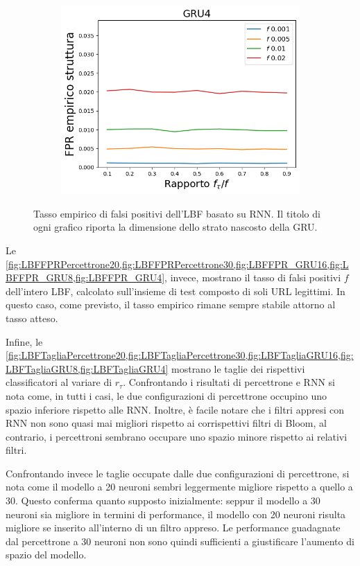 \documentclass[../../main.tex]{subfiles}
\begin{document}
\begin{figure}[H]
        \begin{subfigure}[b]{0.49\textwidth}
            \centering
            \includegraphics[width = \textwidth]{immagini/7/LBF/GRU4_FPR.png}
            \caption{}
            \label{fig:LBFFPR_GRU4}
        \end{subfigure}
        \caption{Tasso empirico di falsi positivi dell'LBF basato su RNN. Il titolo di ogni grafico riporta la dimensione dello strato nascosto della GRU.}
        \label{fig:GRU_LBFFPR}
    \end{figure}

    Le \cref{fig:LBFFPRPercettrone20,fig:LBFFPRPercettrone30,fig:LBFFPR_GRU16,fig:LBFFPR_GRU8,fig:LBFFPR_GRU4}, invece, mostrano il tasso di falsi positivi $f$ dell'intero LBF, calcolato sull'insieme di test composto di soli URL legittimi. In questo caso, come previsto, il tasso empirico rimane sempre stabile attorno al tasso atteso.

    Infine, le \cref{fig:LBFTagliaPercettrone20,fig:LBFTagliaPercettrone30,fig:LBFTagliaGRU16,fig:LBFTagliaGRU8,fig:LBFTagliaGRU4} mostrano le taglie dei rispettivi classificatori al variare di $r_{\tau}$. Confrontando i risultati di percettrone e RNN si nota come, in tutti i casi, le due configurazioni di percettrone occupino uno spazio inferiore rispetto alle RNN. Inoltre, è facile notare che i filtri appresi con RNN non sono quasi mai migliori rispetto ai corrispettivi filtri di Bloom, al contrario, i percettroni sembrano occupare uno spazio minore rispetto ai relativi filtri. 

    Confrontando invece le taglie occupate dalle due configurazioni di percettrone, si nota come il modello a 20 neuroni sembri leggermente migliore rispetto a quello a 30. Questo conferma quanto supposto inizialmente: seppur il modello a 30 neuroni sia migliore in termini di performance, il modello con 20 neuroni risulta migliore se inserito all'interno di un filtro appreso. Le performance guadagnate dal percettrone a 30 neuroni non sono quindi sufficienti a giustificare l'aumento di spazio del modello.
\end{document}
